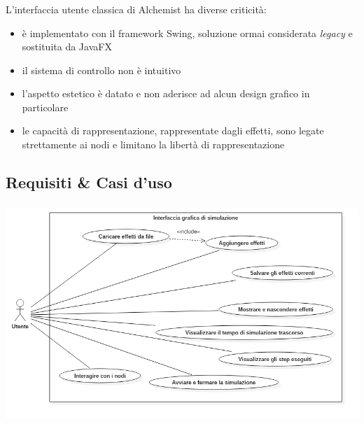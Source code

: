 \documentclass[%
]{beamer}
\newcommand{\engEmph}[1] {\emph{\foreignlanguage{english}#1}}
\begin{document}
            \begin{frame}
                \frametitle{\insertsection}
                \framesubtitle{\insertsubsection}
                L'interfaccia utente classica di Alchemist ha diverse criticità:

                \begin{itemize}[<+(1)->]
                    \item
                        è implementato con il framework Swing, soluzione ormai considerata \engEmph{legacy} e sostituita da JavaFX
                    \item
                        il sistema di controllo non è intuitivo
                    \item
                        l'aspetto estetico è datato e non aderisce ad alcun design grafico in particolare
                    \item
                        le capacità di rappresentazione, rappresentate dagli effetti, sono legate strettamente ai nodi e limitano la libertà di rappresentazione
                \end{itemize}
            \end{frame}

        \subsection{Requisiti \& Casi d'uso}\label{subsec:requisiti}
            \begin{frame}
                \frametitle{\insertsection}
                \framesubtitle{\insertsubsection}
                \centering
                \includegraphics[scale=0.40]{uml/useCaseBeamer}
            \end{frame}
\end{document}
